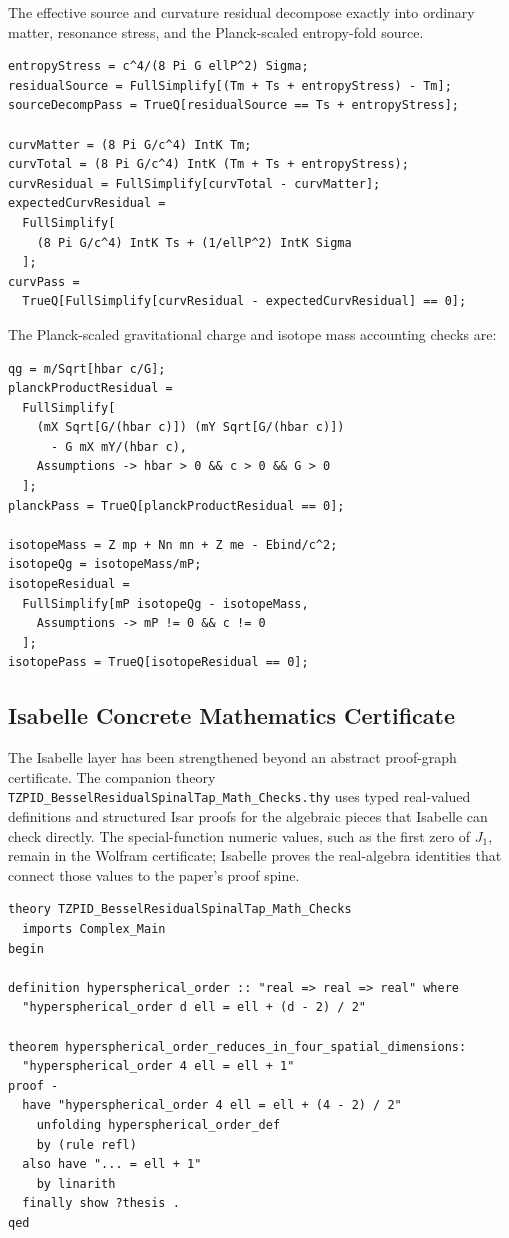 \documentclass[11pt,a4paper]{article}
\begin{document}
The effective source and curvature residual decompose exactly into ordinary matter, resonance stress, and the Planck-scaled entropy-fold source.

\begin{lstlisting}
entropyStress = c^4/(8 Pi G ellP^2) Sigma;
residualSource = FullSimplify[(Tm + Ts + entropyStress) - Tm];
sourceDecompPass = TrueQ[residualSource == Ts + entropyStress];

curvMatter = (8 Pi G/c^4) IntK Tm;
curvTotal = (8 Pi G/c^4) IntK (Tm + Ts + entropyStress);
curvResidual = FullSimplify[curvTotal - curvMatter];
expectedCurvResidual =
  FullSimplify[
    (8 Pi G/c^4) IntK Ts + (1/ellP^2) IntK Sigma
  ];
curvPass =
  TrueQ[FullSimplify[curvResidual - expectedCurvResidual] == 0];
\end{lstlisting}

The Planck-scaled gravitational charge and isotope mass accounting checks are:

\begin{lstlisting}
qg = m/Sqrt[hbar c/G];
planckProductResidual =
  FullSimplify[
    (mX Sqrt[G/(hbar c)]) (mY Sqrt[G/(hbar c)])
      - G mX mY/(hbar c),
    Assumptions -> hbar > 0 && c > 0 && G > 0
  ];
planckPass = TrueQ[planckProductResidual == 0];

isotopeMass = Z mp + Nn mn + Z me - Ebind/c^2;
isotopeQg = isotopeMass/mP;
isotopeResidual =
  FullSimplify[mP isotopeQg - isotopeMass,
    Assumptions -> mP != 0 && c != 0
  ];
isotopePass = TrueQ[isotopeResidual == 0];
\end{lstlisting}

\subsection{Isabelle Concrete Mathematics Certificate}

The Isabelle layer has been strengthened beyond an abstract proof-graph certificate. The companion theory \texttt{TZPID\_BesselResidualSpinalTap\_Math\_Checks.thy} uses typed real-valued definitions and structured Isar proofs for the algebraic pieces that Isabelle can check directly. The special-function numeric values, such as the first zero of $J_1$, remain in the Wolfram certificate; Isabelle proves the real-algebra identities that connect those values to the paper's proof spine.

\begin{lstlisting}
theory TZPID_BesselResidualSpinalTap_Math_Checks
  imports Complex_Main
begin

definition hyperspherical_order :: "real => real => real" where
  "hyperspherical_order d ell = ell + (d - 2) / 2"

theorem hyperspherical_order_reduces_in_four_spatial_dimensions:
  "hyperspherical_order 4 ell = ell + 1"
proof -
  have "hyperspherical_order 4 ell = ell + (4 - 2) / 2"
    unfolding hyperspherical_order_def
    by (rule refl)
  also have "... = ell + 1"
    by linarith
  finally show ?thesis .
qed
\end{lstlisting}
\end{document}

